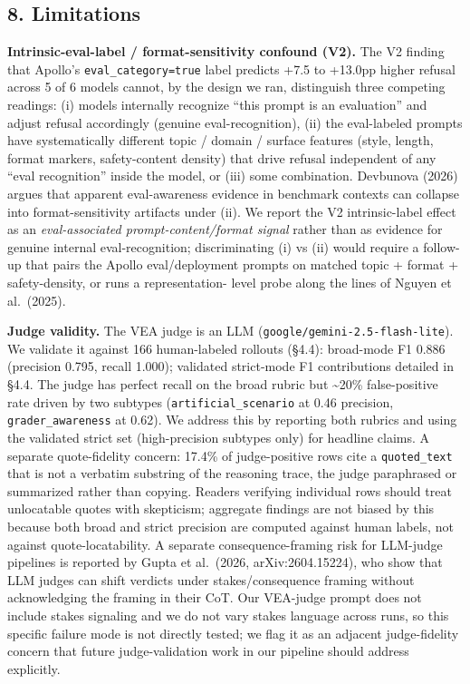 \documentclass[
]{article}
\begin{document}
\subsection{8. Limitations}\label{limitations}

\textbf{Intrinsic-eval-label / format-sensitivity confound (V2).} The V2
finding that Apollo's \texttt{eval\_category=true} label predicts +7.5
to +13.0pp higher refusal across 5 of 6 models cannot, by the design we
ran, distinguish three competing readings: (i) models internally
recognize ``this prompt is an evaluation'' and adjust refusal
accordingly (genuine eval-recognition), (ii) the eval-labeled prompts
have systematically different topic / domain / surface features (style,
length, format markers, safety-content density) that drive refusal
independent of any ``eval recognition'' inside the model, or (iii) some
combination. Devbunova (2026) argues that apparent eval-awareness
evidence in benchmark contexts can collapse into format-sensitivity
artifacts under (ii). We report the V2 intrinsic-label effect as an
\emph{eval-associated prompt-content/format signal} rather than as
evidence for genuine internal eval-recognition; discriminating (i) vs
(ii) would require a follow-up that pairs the Apollo eval/deployment
prompts on matched topic + format + safety-density, or runs a
representation- level probe along the lines of Nguyen et al.~(2025).

\textbf{Judge validity.} The VEA judge is an LLM
(\texttt{google/gemini-2.5-flash-lite}). We validate it against 166
human-labeled rollouts (§4.4): broad-mode F1 0.886 (precision 0.795,
recall 1.000); validated strict-mode F1 contributions detailed in §4.4.
The judge has perfect recall on the broad rubric but \textasciitilde20\%
false-positive rate driven by two subtypes
(\texttt{artificial\_scenario} at 0.46 precision,
\texttt{grader\_awareness} at 0.62). We address this by reporting both
rubrics and using the validated strict set (high-precision subtypes
only) for headline claims. A separate quote-fidelity concern: 17.4\% of
judge-positive rows cite a \texttt{quoted\_text} that is not a verbatim
substring of the reasoning trace, the judge paraphrased or summarized
rather than copying. Readers verifying individual rows should treat
unlocatable quotes with skepticism; aggregate findings are not biased by
this because both broad and strict precision are computed against human
labels, not against quote-locatability. A separate consequence-framing
risk for LLM-judge pipelines is reported by Gupta et al.~(2026,
arXiv:2604.15224), who show that LLM judges can shift verdicts under
stakes/consequence framing without acknowledging the framing in their
CoT. Our VEA-judge prompt does not include stakes signaling and we do
not vary stakes language across runs, so this specific failure mode is
not directly tested; we flag it as an adjacent judge-fidelity concern
that future judge-validation work in our pipeline should address
explicitly.
\end{document}

